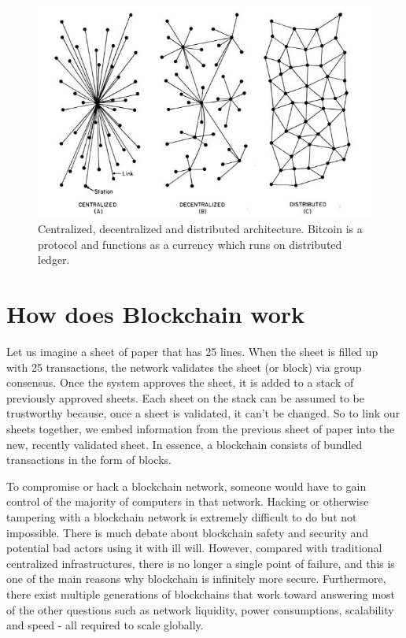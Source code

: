 \begin{figure}
    \centering
    \includegraphics[width=.8\textwidth]{img/ch-exchanges/centralizedvsdecentralized.jpg}
    \caption[Centralized, decentralized and distributed architecture.]{Centralized, decentralized and distributed architecture. Bitcoin is a protocol and functions as a currency which runs on distributed ledger. \cite{lastamericanvagabond}}
    \label{fig:centralized_decentralized_distributed}

\end{figure}

\section{How does Blockchain work}
Let us imagine a sheet of paper that has 25 lines. When the sheet is filled up with 25 transactions, the network validates the sheet (or block) via group consensus. Once the system approves the sheet, it is added to a stack of previously approved sheets. Each sheet on the stack can be assumed to be trustworthy because, once a sheet is validated, it can't be changed. So to link our sheets together, we embed information from the previous sheet of paper into the new, recently validated sheet. In essence, a blockchain consists of bundled transactions in the form of blocks. \cite{course:blockchain_usecases}


To compromise or hack a blockchain network, someone would have to gain control of the majority of computers in that network. Hacking or otherwise tampering with a blockchain network is extremely difficult to do but not impossible. There is much debate about blockchain safety and security and potential bad actors using it with ill will. However, compared with traditional centralized infrastructures, there is no longer a single point of failure, and this is one of the main reasons why blockchain is infinitely more secure. Furthermore, there exist multiple generations of blockchains that work toward answering most of the other questions such as network liquidity, power consumptions, scalability and speed - all required to scale globally.\medskip 



